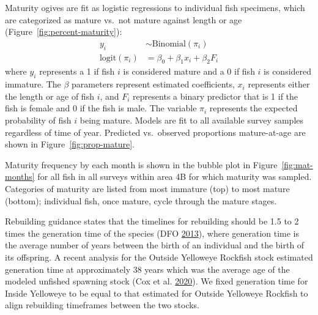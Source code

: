 \documentclass[11pt]{book}
\begin{document}
Maturity ogives are fit as logistic regressions to individual fish specimens, which are categorized as mature vs.~not mature against length or age (Figure~\ref{fig:percent-maturity}):
\begin{align}
y_i &\sim \mathrm{Binomial}(\pi_i)\\
\mathrm{logit} \left( \pi_i \right) &= \beta_0 + \beta_1 x_i + \beta_2 F_i
\end{align}
where \(y_i\) represents a 1 if fish \(i\) is considered mature and a 0 if fish \(i\) is considered immature. The \(\beta\) parameters represent estimated coefficients, \(x_i\) represents either the length or age of fish \(i\), and \(F_i\) represents a binary predictor that is 1 if the fish is female and 0 if the fish is male. The variable \(\pi_i\) represents the expected probability of fish \(i\) being mature. Models are fit to all available survey samples regardless of time of year. Predicted vs.~observed proportions mature-at-age are shown in Figure~\ref{fig:prop-mature}.



Maturity frequency by each month is shown in the bubble plot in Figure~\ref{fig:mat-months} for all fish in all surveys within area 4B for which maturity was sampled. Categories of maturity are listed from most immature (top) to most mature (bottom); individual fish, once mature, cycle through the mature stages.

\hypertarget{sec:generation}{%
\label{sec:generation}}

Rebuilding guidance states that the timelines for rebuilding should be 1.5 to 2 times the generation time of the species (DFO \protect\hyperlink{ref-dfo2013}{2013}), where generation time is the average number of years between the birth of an individual and the birth of its offspring. A recent analysis for the Outside Yelloweye Rockfish stock estimated generation time at approximately 38 years which was the average age of the modeled unfished spawning stock (Cox et al. \protect\hyperlink{ref-cox2020}{2020}). We fixed generation time for Inside Yelloweye to be equal to that estimated for Outside Yelloweye Rockfish to align rebuilding timeframes between the two stocks.
\end{document}
